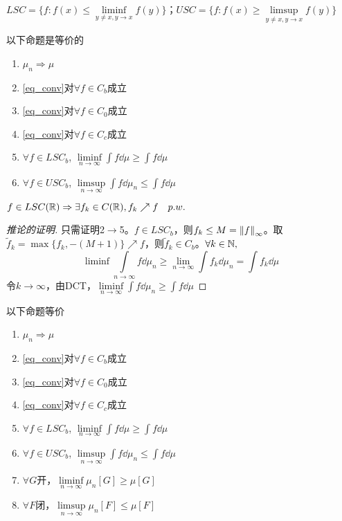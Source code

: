 \documentclass{ctexart}
\begin{document}
$LSC=\{f: f(x)\leq\liminf\limits_{y\neq x,y\to x}f(y)\}$；$USC=\{f:f(x)\geq \limsup\limits_{y\neq x,y\to x}f(y)\}$

\begin{Cor}
  以下命题是等价的
  \begin{enumerate}
  \item $\mu_{n}\Rightarrow \mu$
  \item \ref{eq_conv}对$\forall f\in C_{b}$成立
  \item \ref{eq_conv}对$\forall f\in C_{0}$成立
  \item \ref{eq_conv}对$\forall f\in C_{c}$成立
  \item $\forall f\in LSC_{b}$, $\liminf\limits_{n\to\infty}\int f\dd\mu\geq \int f\dd\mu$
  \item $\forall f\in USC_{b}$, $\limsup\limits_{n\to\infty}\int f\dd\mu_{n}\leq \int f\dd\mu$
  \end{enumerate}
\end{Cor}
\begin{Rmk}
  $f\in LSC(\mathbb{R})\Rightarrow\exists f_{k}\in C(\mathbb{R}),f_{k}\nearrow f\quad p.w.$
\end{Rmk}
\begin{proof}[推论的证明]
  只需证明2$\to$5。$f\in LSC_{b}$，则$f_{k}\leq M=\left\|f\right\|_{\infty}$。取$\tilde f_{k}=\max\{f_{k},-(M+1)\}\nearrow f$，则$\tilde f_{k}\in C_{b}$。$\forall k\in\mathbb{N}, $
  \[\liminf\int \limits_{n\to\infty}f\dd\mu_{n}\geq \lim\limits_{n\to\infty}\int f_{k}\dd\mu_{n}=\int f_{k}\dd\mu\]
  令$k\to \infty$，由DCT，$\liminf\limits_{n\to\infty}\int f\dd\mu_{n}\geq\int f\dd\mu$
\end{proof}

\begin{Cor}
  以下命题等价
  \begin{enumerate}
  \item $\mu_{n}\Rightarrow \mu$
  \item \ref{eq_conv}对$\forall f\in C_{b}$成立
  \item \ref{eq_conv}对$\forall f\in C_{0}$成立
  \item \ref{eq_conv}对$\forall f\in C_{c}$成立
  \item $\forall f\in LSC_{b}$, $\liminf\limits_{n\to\infty}\int f\dd\mu\geq \int f\dd\mu$
  \item $\forall f\in USC_{b}$, $\limsup\limits_{n\to\infty}\int f\dd\mu_{n}\leq \int f\dd\mu$
  \item $\forall G$开，$\liminf\limits_{n\to\infty} \mu_{n}[G]\geq \mu[G]$
  \item $\forall F$闭，$\limsup\limits_{n\to\infty} \mu_{n}[F]\leq \mu[F]$
  \end{enumerate}
\end{Cor}
\end{document}
